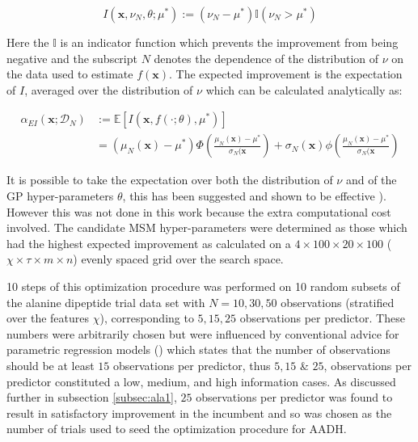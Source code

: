 \begin{equation}
    I(\mathbf{x}, \nu_{N}, \theta; \mu^{*}):=(\nu_{N} - \mu^{*}) \mathbb{I}(\nu_{N} > \mu^{*})
\end{equation}

Here the $\mathbb{I}$ is an indicator function which prevents the improvement from being negative and the subscript $N$ denotes the dependence of the distribution of $\nu$ on the data used to estimate $f(\mathbf{x})$. The expected improvement is the expectation of $I$, averaged over the distribution of $\nu$ which can be calculated analytically as: 

\begin{align}
        \alpha_{EI}(\mathbf{x}; \mathcal{D}_{N}) & := \mathbb{E}\left[I(\mathbf{x}, f(\cdot; \theta), \mu^{*})\right] \\
        & = (\mu_{N}(\mathbf{x}) - \mu^{*})\Phi\left( \frac{ \mu_{N}(\mathbf{x}) - \mu^{*} }{\sigma_{N}(\mathbf{x} } \right ) + \sigma_{N}(\mathbf{x})\phi\left( \frac{ \mu_{N}(\mathbf{x}) - \mu^{*} }{\sigma_{N}(\mathbf{x} } \right )
\end{align}

It is possible to take the expectation over both the distribution of $\nu$ and of the GP hyper-parameters $\theta$, this has been suggested and shown to be effective \cite{NIPS2012_4522}). However this was not done in this work because the extra computational cost involved. The candidate MSM hyper-parameters were determined as those which had the highest expected improvement as calculated on a $4 \times 100 \times 20 \times 100$ ($\chi \times \tau \times m \times n$) evenly spaced grid over the search space.

10 steps of this optimization procedure was performed on 10 random subsets of the alanine dipeptide trial data  set with $N=10, 30, 50$ observations  (stratified over the features $\chi$), corresponding to $5, 15, 25$ observations per predictor. These numbers were arbitrarily chosen but were influenced by conventional advice for parametric regression models (\cite{harrelRegressionModelingStrategies2015}) which states that the number of observations should be at least $15$ observations per predictor, thus $5, 15$ \& $25$, observations per predictor constituted a low, medium, and high information cases.  As discussed further in subsection \ref{subsec:ala1}, $25$ observations per predictor was found to result in satisfactory improvement in the incumbent and so was chosen as the number of trials used to seed the optimization procedure for AADH. 

